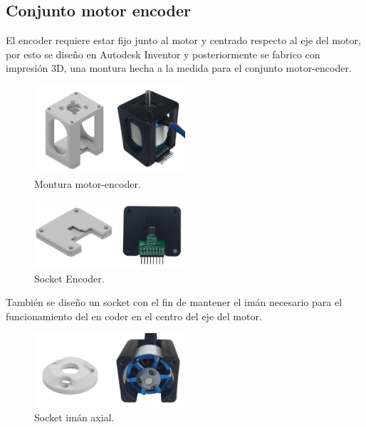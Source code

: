\documentclass[11pt]{report}
\begin{document}
\newpage
\subsection{Conjunto motor encoder}
El encoder requiere estar fijo junto al motor y centrado respecto al eje del motor, por esto se diseño en Autodesk Inventor y posteriormente se fabrico con impresión 3D, una montura hecha a la medida para el conjunto motor-encoder.

\begin{figure}[ht]
	\centering
	\includegraphics[width=0.5\textwidth]{imagenes/Motor/conjunto.png}
	\caption{Montura motor-encoder.}
	\label{fig:Montura}
\end{figure}
\FloatBarrier

\begin{figure}[ht]
	\centering
	\includegraphics[width=0.5\textwidth]{imagenes/Motor/encoder.png}
	\caption{Socket Encoder.}
	\label{fig:encoder}
\end{figure}
\FloatBarrier

También se diseño un socket con el fin de mantener el imán necesario para el funcionamiento del en coder en el centro del eje del motor.

\begin{figure}[ht]
	\centering
	\includegraphics[width=0.5\textwidth]{imagenes/Motor/iman.png}
	\caption{Socket imán axial.}
	\label{fig:iman}
\end{figure}
\FloatBarrier
\end{document}
